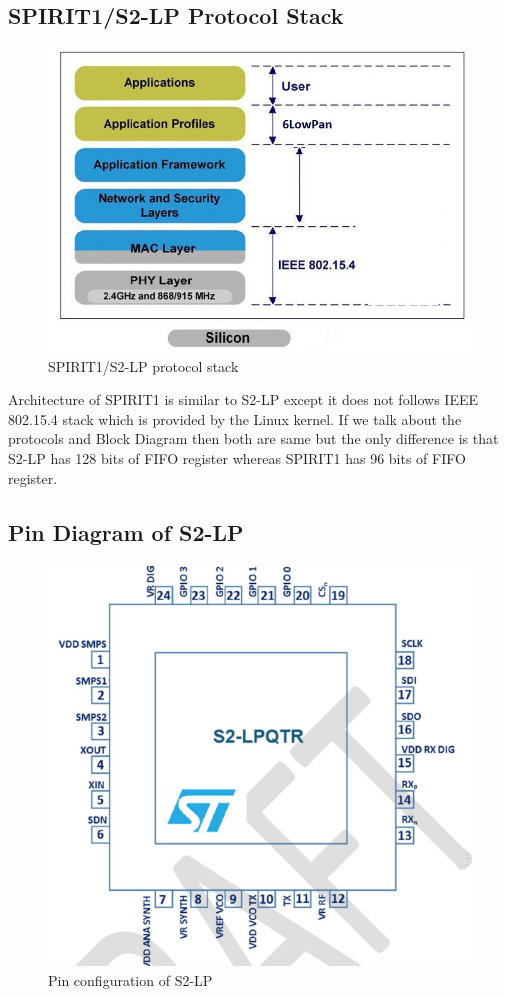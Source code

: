 \subsection{SPIRIT1/S2-LP Protocol Stack}
\begin{figure}[ht]
	\centering
	\includegraphics[scale=0.8]{images/protocol.png}
	\caption{SPIRIT1/S2-LP protocol stack}
\end{figure}
Architecture of SPIRIT1 is similar to S2-LP except it does not follows IEEE 802.15.4 stack which is provided by the Linux kernel. If we talk about the protocols and Block Diagram then both are same but the only difference is that S2-LP has 128 bits of FIFO register whereas SPIRIT1 has 96 bits of FIFO register.
\subsection{Pin Diagram of S2-LP}
\begin{figure}[ht]
	\centering
	\includegraphics[scale=0.8]{images/pindiagram.png}
	\caption{Pin configuration of S2-LP}
\end{figure}
